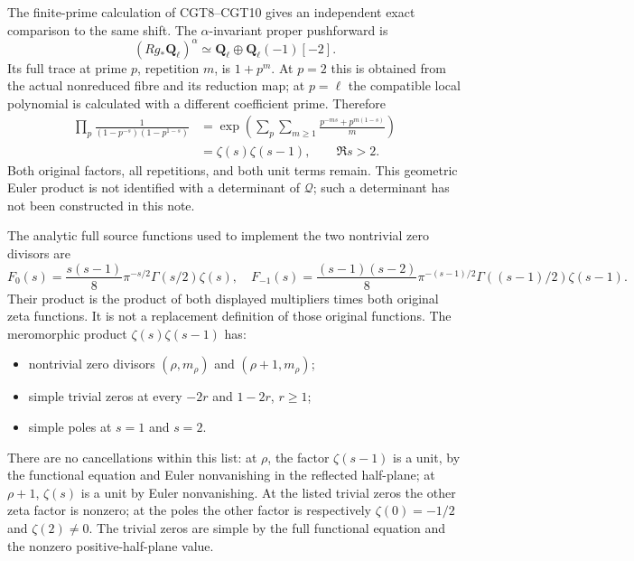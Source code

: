 The finite-prime calculation of CGT8--CGT10 gives an independent exact
comparison to the same shift. The \(\alpha\)-invariant proper
pushforward is \[
(Rg_*\mathbf Q_\ell)^\alpha
\simeq\mathbf Q_\ell\oplus\mathbf Q_\ell(-1)[-2].
\tag{GTZ6.1}
\] Its full trace at prime \(p\), repetition \(m\), is \(1+p^m\). At
\(p=2\) this is obtained from the actual nonreduced fibre and its
reduction map; at \(p=\ell\) the compatible local polynomial is
calculated with a different coefficient prime. Therefore \[
\begin{aligned}
\prod_p\frac1{(1-p^{-s})(1-p^{1-s})}
&=\exp\!\left(\sum_p\sum_{m\ge1}
\frac{p^{-ms}+p^{m(1-s)}}m\right)\\
&=\zeta(s)\zeta(s-1),\qquad \Re s>2.
\end{aligned}
\tag{GTZ6.2}
\] Both original factors, all repetitions, and both unit terms remain.
This geometric Euler product is not identified with a determinant of
\(\mathcal Q\); such a determinant has not been constructed in this
note.

The analytic full source functions used to implement the two nontrivial
zero divisors are \[
F_0(s)=\frac{s(s-1)}8\pi^{-s/2}\Gamma(s/2)\zeta(s),
\quad
F_{-1}(s)=\frac{(s-1)(s-2)}8
\pi^{-(s-1)/2}\Gamma((s-1)/2)\zeta(s-1).
\tag{GTZ6.3}
\] Their product is the product of both displayed multipliers times both
original zeta functions. It is not a replacement definition of those
original functions. The meromorphic product \(\zeta(s)\zeta(s-1)\) has:

\begin{itemize}
\tightlist
\item
  nontrivial zero divisors \((\rho,m_\rho)\) and \((\rho+1,m_\rho)\);
\item
  simple trivial zeros at every \(-2r\) and \(1-2r\), \(r\ge1\);
\item
  simple poles at \(s=1\) and \(s=2\).
\end{itemize}

There are no cancellations within this list: at \(\rho\), the factor
\(\zeta(s-1)\) is a unit, by the functional equation and Euler
nonvanishing in the reflected half-plane; at \(\rho+1\), \(\zeta(s)\) is
a unit by Euler nonvanishing. At the listed trivial zeros the other zeta
factor is nonzero; at the poles the other factor is respectively
\(\zeta(0)=-1/2\) and \(\zeta(2)\ne0\). The trivial zeros are simple by
the full functional equation and the nonzero positive-half-plane value.

